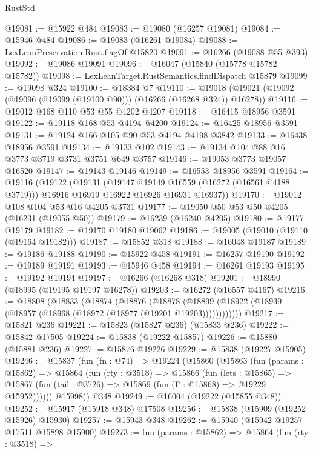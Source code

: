\begin{lexlean}{RustStd}
\begin{coremodule}
@19081 := @15922 @484
@19083 := @19080 (@16257 @19081)
@19084 := @15946 @484
@19086 := @19083 (@16261 @19084)
@19088 := LexLeanPreservation.Rust.flagOf @15820
@19091 := @16266 (@19088 @55 @393)
@19092 := @19086 @19091
@19096 := @16047 (@15840 (@15778 @15782 @15782))
@19098 := LexLeanTarget.RustSemantics.findDispatch @15879
@19099 := @19098 @324
@19100 := @18384 @7
@19110 := @19018 (@19021 (@19092 (@19096 (@19099 (@19100 @90))) (@16266 (@16268 @324)) @16278))
@19116 := @19012 @168 @110 @53 @55 @4202 @4207
@19118 := @16415 @18956 @3591
@19122 := @19118 @168 @53 @4194 @4200
@19124 := @16425 @18956 @3591
@19131 := @19124 @166 @105 @90 @53 @4194 @4198 @3842
@19133 := @16438 @18956 @3591
@19134 := @19133 @102
@19143 := @19134 @104 @88 @16 @3773 @3719 @3731 @3751 @649 @3757
@19146 := @19053 @3773 @19057 @16520
@19147 := @19143 @19146
@19149 := @16553 @18956 @3591
@19164 := @19116
    (@19122
      (@19131
        (@19147 @19149 @16559 (@16272 (@16561 @4188 @3719)))
        @16916
        @16919
        @16922
        @16926
        @16931
        @16937))
@19170 := @19012 @108 @104 @53 @16 @4205 @3731
@19177 := @19050 @50 @53 @50 @4205 (@16231 (@19055 @50))
@19179 := @16239 (@16240 @4205)
@19180 := @19177 @19179
@19182 := @19170 @19180 @19062
@19186 := @19005 (@19010 (@19110 (@19164 @19182)))
@19187 := @15852 @318
@19188 := @16048 @19187
@19189 := @19186 @19188
@19190 := @15922 @458
@19191 := @16257 @19190
@19192 := @19189 @19191
@19193 := @15946 @458
@19194 := @16261 @19193
@19195 := @19192 @19194
@19197 := @16266 (@16268 @318)
@19201 := @18990 (@18995 (@19195 @19197 @16278))
@19203 := @16272 (@16557 @4167)
@19216 := @18808
    (@18833
      (@18874
        (@18876
          (@18878 (@18899 (@18922 (@18939 (@18957 (@18968 (@18972 (@18977 (@19201 @19203))))))))))))
@19217 := @15821 @236
@19221 := @15823 (@15827 @236) (@15833 @236)
@19222 := @15842 @17505
@19224 := @15838 (@19222 @15857)
@19226 := @15880 (@15881 @236)
@19227 := @15876 @19226
@19229 := @15838 (@19227 @15905)
@19246 := @15837
    (fun (fn : @74) =>
    @19224
      (@15860
        (@15863
          (fun (params : @15862) =>
          @15864
            (fun (rty : @3518) =>
            @15866
              (fun (lets : @15865) =>
              @15867 (fun (tail : @3726) => @15869 (fun (Γ : @15868) => @19229 @15952))))))
        @15998))
    @348
@19249 := @16004 (@19222 (@15855 @348))
@19252 := @15917 (@15918 @348) @17508
@19256 := @15838 (@15909 (@19252 @15926) @15930)
@19257 := @15943 @348
@19262 := @15940 (@15942 @19257 @17511 @15898 @15900)
@19273 := fun (params : @15862) =>
  @15864
    (fun (rty : @3518) =>

\end{coremodule}
\end{lexlean}
